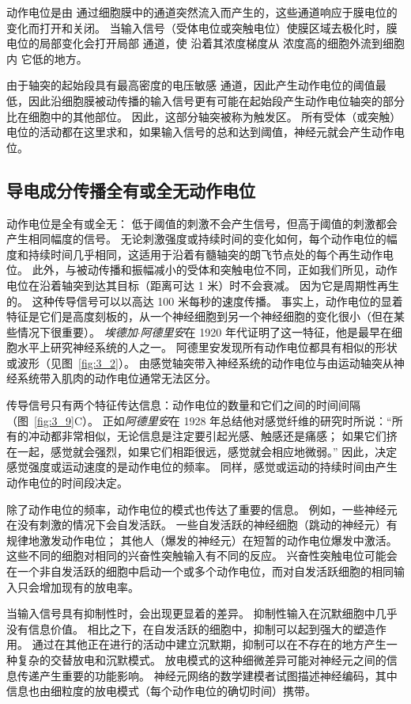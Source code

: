 动作电位是由  通过细胞膜中的通道突然流入而产生的，这些通道响应于膜电位的变化而打开和关闭。 
当输入信号（受体电位或突触电位）使膜区域去极化时，膜电位的局部变化会打开局部  通道，使  沿着其浓度梯度从  浓度高的细胞外流到细胞内 它低的地方。


由于轴突的起始段具有最高密度的电压敏感  通道，因此产生动作电位的阈值最低，因此沿细胞膜被动传播的输入信号更有可能在起始段产生动作电位轴突的部分比在细胞中的其他部位。
因此，这部分轴突被称为触发区。
所有受体（或突触）电位的活动都在这里求和，如果输入信号的总和达到阈值，神经元就会产生动作电位。


\subsection{导电成分传播全有或全无动作电位}
动作电位是全有或全无：
低于阈值的刺激不会产生信号，但高于阈值的刺激都会产生相同幅度的信号。
无论刺激强度或持续时间的变化如何，每个动作电位的幅度和持续时间几乎相同，这适用于沿着有髓轴突的朗飞节点处的每个再生动作电位。
此外，与被动传播和振幅减小的受体和突触电位不同，正如我们所见，动作电位在沿着轴突到达其目标（距离可达 1 米）时不会衰减。 
因为它是周期性再生的。
这种传导信号可以以高达 100 米每秒的速度传播。 
事实上，动作电位的显着特征是它们是高度刻板的，从一个神经细胞到另一个神经细胞的变化很小（但在某些情况下很重要）。 
\textit{埃德加$\cdot$阿德里安}在 1920 年代证明了这一特征，他是最早在细胞水平上研究神经系统的人之一。
阿德里安发现所有动作电位都具有相似的形状或波形（见图~\ref{fig:3_2}）。
由感觉轴突带入神经系统的动作电位与由运动轴突从神经系统带入肌肉的动作电位通常无法区分。


传导信号只有两个特征传达信息：动作电位的数量和它们之间的时间间隔（图~\ref{fig:3_9}C）。 
正如\textit{阿德里安}在 1928 年总结他对感觉纤维的研究时所说：“所有的冲动都非常相似，无论信息是注定要引起光感、触感还是痛感；
如果它们挤在一起，感觉就会强烈，如果它们相距很远，感觉就会相应地微弱。” 
因此，决定感觉强度或运动速度的是动作电位的频率。
同样，感觉或运动的持续时间由产生动作电位的时间段决定。


除了动作电位的频率，动作电位的模式也传达了重要的信息。
例如，一些神经元在没有刺激的情况下会自发活跃。
一些自发活跃的神经细胞（跳动的神经元）有规律地激发动作电位；
其他人（爆发的神经元）在短暂的动作电位爆发中激活。
这些不同的细胞对相同的兴奋性突触输入有不同的反应。
兴奋性突触电位可能会在一个非自发活跃的细胞中启动一个或多个动作电位，而对自发活跃细胞的相同输入只会增加现有的放电率。


当输入信号具有抑制性时，会出现更显着的差异。
抑制性输入在沉默细胞中几乎没有信息价值。 
相比之下，在自发活跃的细胞中，抑制可以起到强大的塑造作用。
通过在其他正在进行的活动中建立沉默期，抑制可以在不存在的地方产生一种复杂的交替放电和沉默模式。
放电模式的这种细微差异可能对神经元之间的信息传递产生重要的功能影响。
神经元网络的数学建模者试图描述神经编码，其中信息也由细粒度的放电模式（每个动作电位的确切时间）携带。


